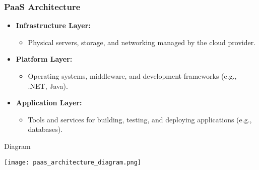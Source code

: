 \documentclass[aspectratio=169]{beamer}
\begin{document}
\begin{frame}[fragile]
    \frametitle{PaaS Architecture}
    
    \begin{itemize}
        \item \textbf{Infrastructure Layer:} 
        \begin{itemize}
            \item Physical servers, storage, and networking managed by the cloud provider.
        \end{itemize}

        \item \textbf{Platform Layer:} 
        \begin{itemize}
            \item Operating systems, middleware, and development frameworks (e.g., .NET, Java).
        \end{itemize}
        
        \item \textbf{Application Layer:}
        \begin{itemize}
            \item Tools and services for building, testing, and deploying applications (e.g., databases).
        \end{itemize}
    \end{itemize}
    
    \begin{block}{Diagram}
    \begin{center}
    \texttt{[image: paas\_architecture\_diagram.png]} %
    \end{center}
    \end{block}
\end{frame}
\end{document}
